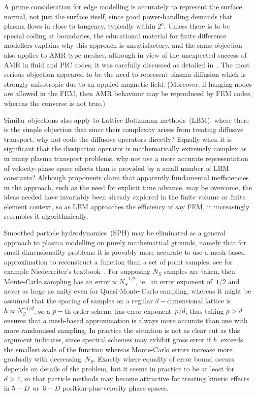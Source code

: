 A prime consideration for edge modelling is accurately to represent the surface
normal, not just the surface itself, since good power-handling demands that
plasma flows in close to tangency, typically within $2^{o}$. Unless there is to be
special coding at boundaries, the educational material for finite difference
modellers explains why this approach is unsatisfactory, and the same objection
also applies to AMR type meshes, although in view of the unexpected success of AMR
in fluid and PIC codes, it was carefully discussed as detailed in~\cite{y1re211}. The
most serious objection appeared to be the need to represent plasma diffusion
which is strongly anisotropic due to an applied magnetic field. (Moreover,
if hanging nodes are allowed in the FEM, then AMR behaviour may be reproduced by FEM codes,
whereas the converse is not true.)

Similar objections also apply to Lattice Boltzmann methods~(LBM), where there is the simple
objection that since their complexity arises from treating diffusive transport, why not code
the diffusive operators directly? Equally when it is significant that
the dissipation operator is mathematically extremely complex as
in many plasma transport problems, why not use a more accurate representation of
velocity-phase space effects than is provided by a small number of LBM constants?
Although proponents claim that apparently fundamental inefficiencies in the approach,
such as the need for explicit time advance, may be overcome, the ideas needed have
invariably been already explored in the finite volume or finite element context,
so as LBM approaches the efficiency of say FEM, it increasingly resembles it algorithmically.

Smoothed particle hydrodynamics~(SPH) may be eliminated as a general approach to
plasma modelling on purely mathematical grounds, namely that for small dimensionality
problems it is provably more accurate to use a mesh-based approximation to reconstruct a function
than a set of point samples, see for example Niederreiter's textbook~\cite{niederreiter}.
For supposing $N_S$ samples are taken, then Monte-Carlo sampling has an error$\propto N_S^{-1/2}$,
ie.\ an error exponent of~$1/2$ and  never as large as unity even for Quasi-Monte-Carlo sampling,
whereas it might be assumed that the spacing of samples on a regular $d-$dimensional lattice
is~$h\propto N_S^{-1/d}$, so a $p-$th order scheme has error exponent~$p/d$, thus taking $p>d$
ensures that a mesh-based approximation is always more accurate than one with more
randomised sampling. In practice the situation is not as clear cut as this argument indicates, since
spectral schemes may exhibit gross error if $h$~exceeds the smallest scale of the
function whereas Monte-Carlo errors increase more gradually with decreasing~$N_S$.
Exactly where equality of error bound occurs depends on details of the problem, but it seems in
practice to be at least for $d>4$, so that particle methods may become attractive for
treating kinetic effects in $5-D$~or~$6-D$ position-plus-velocity phase spaces.

